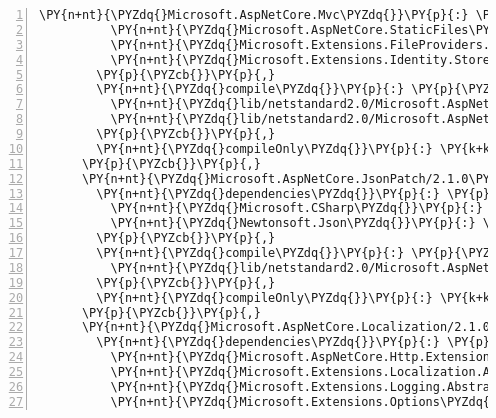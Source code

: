 \begin{Verbatim}[commandchars=\\\{\},numbers=left,firstnumber=1,stepnumber=1,numberblanklines=0]
          \PY{n+nt}{\PYZdq{}Microsoft.AspNetCore.Mvc\PYZdq{}}\PY{p}{:} \PY{l+s+s2}{\PYZdq{}2.1.0\PYZhy{}rc1\PYZhy{}final\PYZdq{}}\PY{p}{,}
          \PY{n+nt}{\PYZdq{}Microsoft.AspNetCore.StaticFiles\PYZdq{}}\PY{p}{:} \PY{l+s+s2}{\PYZdq{}2.1.0\PYZhy{}rc1\PYZhy{}final\PYZdq{}}\PY{p}{,}
          \PY{n+nt}{\PYZdq{}Microsoft.Extensions.FileProviders.Embedded\PYZdq{}}\PY{p}{:} \PY{l+s+s2}{\PYZdq{}2.1.0\PYZhy{}rc1\PYZhy{}final\PYZdq{}}\PY{p}{,}
          \PY{n+nt}{\PYZdq{}Microsoft.Extensions.Identity.Stores\PYZdq{}}\PY{p}{:} \PY{l+s+s2}{\PYZdq{}2.1.0\PYZhy{}rc1\PYZhy{}final\PYZdq{}}
        \PY{p}{\PYZcb{}}\PY{p}{,}
        \PY{n+nt}{\PYZdq{}compile\PYZdq{}}\PY{p}{:} \PY{p}{\PYZob{}}
          \PY{n+nt}{\PYZdq{}lib/netstandard2.0/Microsoft.AspNetCore.Identity.UI.Views.dll\PYZdq{}}\PY{p}{:} \PY{p}{\PYZob{}}\PY{p}{\PYZcb{}}\PY{p}{,}
          \PY{n+nt}{\PYZdq{}lib/netstandard2.0/Microsoft.AspNetCore.Identity.UI.dll\PYZdq{}}\PY{p}{:} \PY{p}{\PYZob{}}\PY{p}{\PYZcb{}}
        \PY{p}{\PYZcb{}}\PY{p}{,}
        \PY{n+nt}{\PYZdq{}compileOnly\PYZdq{}}\PY{p}{:} \PY{k+kc}{true}
      \PY{p}{\PYZcb{}}\PY{p}{,}
      \PY{n+nt}{\PYZdq{}Microsoft.AspNetCore.JsonPatch/2.1.0\PYZhy{}rc1\PYZhy{}final\PYZdq{}}\PY{p}{:} \PY{p}{\PYZob{}}
        \PY{n+nt}{\PYZdq{}dependencies\PYZdq{}}\PY{p}{:} \PY{p}{\PYZob{}}
          \PY{n+nt}{\PYZdq{}Microsoft.CSharp\PYZdq{}}\PY{p}{:} \PY{l+s+s2}{\PYZdq{}4.5.0\PYZhy{}rc1\PYZdq{}}\PY{p}{,}
          \PY{n+nt}{\PYZdq{}Newtonsoft.Json\PYZdq{}}\PY{p}{:} \PY{l+s+s2}{\PYZdq{}11.0.2\PYZdq{}}
        \PY{p}{\PYZcb{}}\PY{p}{,}
        \PY{n+nt}{\PYZdq{}compile\PYZdq{}}\PY{p}{:} \PY{p}{\PYZob{}}
          \PY{n+nt}{\PYZdq{}lib/netstandard2.0/Microsoft.AspNetCore.JsonPatch.dll\PYZdq{}}\PY{p}{:} \PY{p}{\PYZob{}}\PY{p}{\PYZcb{}}
        \PY{p}{\PYZcb{}}\PY{p}{,}
        \PY{n+nt}{\PYZdq{}compileOnly\PYZdq{}}\PY{p}{:} \PY{k+kc}{true}
      \PY{p}{\PYZcb{}}\PY{p}{,}
      \PY{n+nt}{\PYZdq{}Microsoft.AspNetCore.Localization/2.1.0\PYZhy{}rc1\PYZhy{}final\PYZdq{}}\PY{p}{:} \PY{p}{\PYZob{}}
        \PY{n+nt}{\PYZdq{}dependencies\PYZdq{}}\PY{p}{:} \PY{p}{\PYZob{}}
          \PY{n+nt}{\PYZdq{}Microsoft.AspNetCore.Http.Extensions\PYZdq{}}\PY{p}{:} \PY{l+s+s2}{\PYZdq{}2.1.0\PYZhy{}rc1\PYZhy{}final\PYZdq{}}\PY{p}{,}
          \PY{n+nt}{\PYZdq{}Microsoft.Extensions.Localization.Abstractions\PYZdq{}}\PY{p}{:} \PY{l+s+s2}{\PYZdq{}2.1.0\PYZhy{}rc1\PYZhy{}final\PYZdq{}}\PY{p}{,}
          \PY{n+nt}{\PYZdq{}Microsoft.Extensions.Logging.Abstractions\PYZdq{}}\PY{p}{:} \PY{l+s+s2}{\PYZdq{}2.1.0\PYZhy{}rc1\PYZhy{}final\PYZdq{}}\PY{p}{,}
          \PY{n+nt}{\PYZdq{}Microsoft.Extensions.Options\PYZdq{}}\PY{p}{:} \PY{l+s+s2}{\PYZdq{}2.1.0\PYZhy{}rc1\PYZhy{}final\PYZdq{}}

\end{Verbatim}
